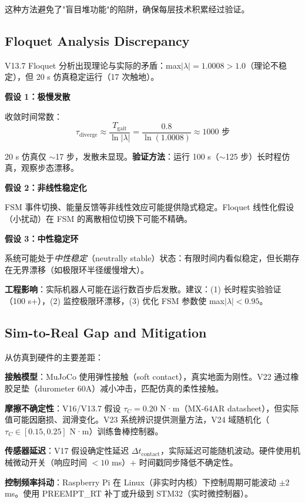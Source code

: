 这种方法避免了"盲目堆功能"的陷阱，确保每层技术积累经过验证。

\subsection{Floquet Analysis Discrepancy}

V13.7 Floquet 分析出现理论与实际的矛盾：max$|\lambda| = 1.0008 > 1.0$（理论不稳定），但 20 s 仿真稳定运行（17 次触地）。

\textbf{假设 1：极慢发散}

收敛时间常数：
\begin{equation}
    \tau_{\text{diverge}} \approx \frac{T_{\text{gait}}}{\ln|\lambda|} = \frac{0.8}{\ln(1.0008)} \approx 1000 \text{ 步}
\end{equation}

20 s 仿真仅 $\sim$17 步，发散未显现。\textbf{验证方法}：运行 100 s（$\sim$125 步）长时程仿真，观察步态漂移。

\textbf{假设 2：非线性稳定化}

FSM 事件切换、能量反馈等非线性效应可能提供隐式稳定。Floquet 线性化假设（小扰动）在 FSM 的离散相位切换下可能不精确。

\textbf{假设 3：中性稳定环}

系统可能处于\textit{中性稳定}（neutrally stable）状态：有限时间内看似稳定，但长期存在无界漂移（如极限环半径缓慢增大）。

\textbf{工程影响}：实际机器人可能在运行数百步后发散。建议：(1) 长时程实验验证（100 s+），(2) 监控极限环漂移，(3) 优化 FSM 参数使 max$|\lambda| < 0.95$。

\subsection{Sim-to-Real Gap and Mitigation}

从仿真到硬件的主要差距：

\textbf{接触模型}：MuJoCo 使用弹性接触（soft contact），真实地面为刚性。V22 通过橡胶足垫（durometer 60A）减小冲击，匹配仿真的柔性接触。

\textbf{摩擦不确定性}：V16/V13.7 假设 $\tau_C = 0.20$ N·m（MX-64AR datasheet），但实际值可能因磨损、润滑变化。V23 系统辨识提供测量方法，V24 域随机化（$\tau_C \in [0.15, 0.25]$ N·m）训练鲁棒控制器。

\textbf{传感器延迟}：V17 假设确定性延迟 $\Delta t_{\text{contact}}$，实际延迟可能随机波动。硬件使用机械微动开关（响应时间 $<10$ ms）+ 时间戳同步降低不确定性。

\textbf{控制频率抖动}：Raspberry Pi 在 Linux（非实时内核）下控制周期可能波动 $\pm 2$ ms。使用 PREEMPT\_RT 补丁或升级到 STM32（实时微控制器）。

